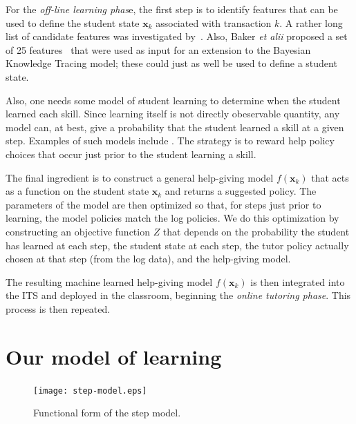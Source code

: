 \documentclass{edm_template}
\begin{document}
For the {\em off-line learning phas}e, the first step is to identify
features that can be used to define the student state $\mathbf{x}_k$
associated with transaction $k$.  A rather
long list of candidate features was investigated
by~\cite{chi_micro-level_2009}.  Also, Baker {\em et alii} proposed
a set of 25 features~\citeyear{baker_more_2008} that were used as input 
for an extension to the Bayesian Knowledge Tracing model;  these
could just as well be used to define a student state.

Also, one needs some model of student learning to determine when the
student learned each skill.  Since learning itself is not directly
obeservable quantity, any model can, at best, give a probability that
the student learned a skill at a given step.  Examples of such models
include \cite{van_de_sande_measuring_2013,baker_detecting_2010}.
The strategy is to reward help policy choices that occur
just prior to the student learning a skill.

The final ingredient is to construct a general help-giving model $f(\mathbf{x}_k)$ that
acts as a function on the student state $\mathbf{x}_k$  and returns a suggested policy.
The parameters of the model are then optimized so that, for steps
just prior to learning, the model policies match the log policies.
We do this optimization by constructing an objective function $Z$ that
depends on the probability the student has learned at each step, the
student state at each step,  the tutor policy actually chosen at
that step (from the log data), and the help-giving model.

The resulting machine learned help-giving model $f(\mathbf{x}_k)$ is
then integrated into the  ITS and deployed in the classroom, beginning
the {\em online tutoring phase}.  This process is then repeated.


\section{Our model of learning}

\begin{figure}
\centering    \texttt{[image: step-model.eps]}
  \caption{Functional form of the step model.}
         \label{stepf}
\end{figure}
\end{document}
